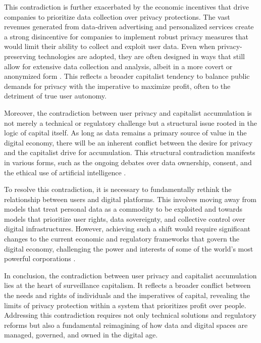 This contradiction is further exacerbated by the economic incentives that drive companies to prioritize data collection over privacy protections. The vast revenues generated from data-driven advertising and personalized services create a strong disincentive for companies to implement robust privacy measures that would limit their ability to collect and exploit user data. Even when privacy-preserving technologies are adopted, they are often designed in ways that still allow for extensive data collection and analysis, albeit in a more covert or anonymized form \cite[pp.~82-85]{schneier2015data}. This reflects a broader capitalist tendency to balance public demands for privacy with the imperative to maximize profit, often to the detriment of true user autonomy.

Moreover, the contradiction between user privacy and capitalist accumulation is not merely a technical or regulatory challenge but a structural issue rooted in the logic of capital itself. As long as data remains a primary source of value in the digital economy, there will be an inherent conflict between the desire for privacy and the capitalist drive for accumulation. This structural contradiction manifests in various forms, such as the ongoing debates over data ownership, consent, and the ethical use of artificial intelligence \cite[pp.~101-104]{zeynep2014engineering}.

To resolve this contradiction, it is necessary to fundamentally rethink the relationship between users and digital platforms. This involves moving away from models that treat personal data as a commodity to be exploited and towards models that prioritize user rights, data sovereignty, and collective control over digital infrastructures. However, achieving such a shift would require significant changes to the current economic and regulatory frameworks that govern the digital economy, challenging the power and interests of some of the world’s most powerful corporations \cite[pp.~213-216]{morozov2013to}.

In conclusion, the contradiction between user privacy and capitalist accumulation lies at the heart of surveillance capitalism. It reflects a broader conflict between the needs and rights of individuals and the imperatives of capital, revealing the limits of privacy protection within a system that prioritizes profit over people. Addressing this contradiction requires not only technical solutions and regulatory reforms but also a fundamental reimagining of how data and digital spaces are managed, governed, and owned in the digital age.

